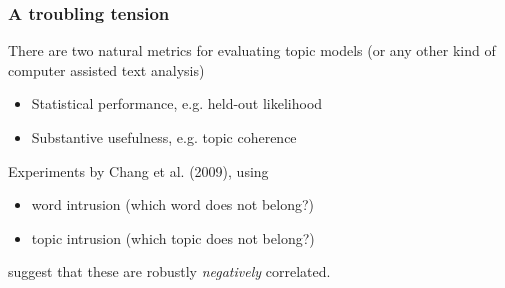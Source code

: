 \documentclass[11pt,compress,professionalfonts]{beamer}
\newcommand{\ita}{\begin{itemize}}
\newcommand{\itm}{\item[]}
\newcommand{\itz}{\end{itemize}}
\begin{document}
\begin{frame}[t]\frametitle{A troubling tension}

There are two natural metrics for evaluating topic models (or any other kind of computer assisted text analysis)
\ita
\itm Statistical performance, e.g. held-out likelihood
\itm Substantive usefulness, e.g. topic coherence
\itz
Experiments by Chang et al. (2009), using
\ita
\itm word intrusion (which word does not belong?)
\itm topic intrusion (which topic does not belong?)
\itz
suggest that these are robustly \textit{negatively} correlated.



%

%
%
%
%
%
%
%
%
%
%
%
%
%
%
%
%
%





\end{frame}
\end{document}
